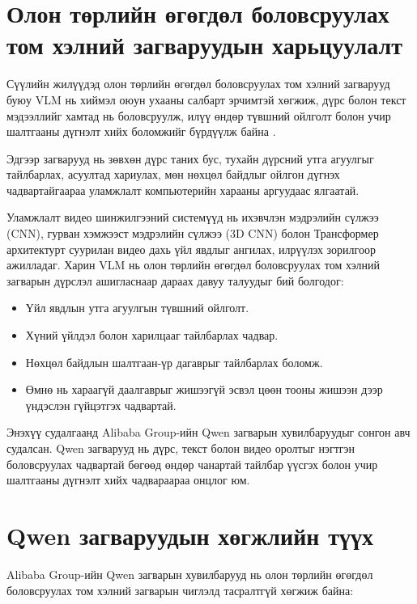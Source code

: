 \section{Олон төрлийн өгөгдөл боловсруулах том хэлний загваруудын харьцуулалт}

Сүүлийн жилүүдэд олон төрлийн өгөгдөл боловсруулах том хэлний загварууд буюу VLM нь хиймэл оюун ухааны салбарт эрчимтэй хөгжиж, дүрс болон текст мэдээллийг хамтад нь боловсруулж, илүү өндөр түвшний ойлголт болон учир шалтгааны дүгнэлт хийх боломжийг бүрдүүлж байна \cite{liu2023llava}.

Эдгээр загварууд нь зөвхөн дүрс таних бус, тухайн дүрсний утга агуулгыг тайлбарлах, асуултад хариулах, мөн нөхцөл байдлыг ойлгон дүгнэх чадвартайгаараа уламжлалт компьютерийн харааны аргуудаас ялгаатай.

Уламжлалт видео шинжилгээний системүүд нь ихэвчлэн мэдрэлийн сүлжээ (CNN), гурван хэмжээст  мэдрэлийн сүлжээ (3D CNN) болон Трансформер архитектурт суурилан видео дахь үйл явдлыг ангилах, илрүүлэх зорилгоор ажилладаг. Харин VLM нь олон төрлийн өгөгдөл боловсруулах том хэлний загварын дүрслэл ашигласнаар дараах давуу талуудыг бий болгодог:

\begin{itemize}
    \item Үйл явдлын утга агуулгын түвшний ойлголт.
    \item Хүний үйлдэл болон харилцааг тайлбарлах чадвар.
    \item Нөхцөл байдлын шалтгаан-үр дагаврыг тайлбарлах боломж.
    \item Өмнө нь хараагүй даалгаврыг жишээгүй эсвэл цөөн тооны жишээн дээр үндэслэн гүйцэтгэх чадвартай.
\end{itemize}

Энэхүү судалгаанд Alibaba Group-ийн Qwen загварын хувилбаруудыг \cite{qwen2vl2024,qwen25vl2025} сонгон авч судалсан. Qwen загварууд нь дүрс, текст болон видео оролтыг нэгтгэн боловсруулах чадвартай бөгөөд өндөр чанартай тайлбар үүсгэх болон учир шалтгааны дүгнэлт хийх чадвараараа онцлог юм.

\section{Qwen загваруудын хөгжлийн түүх}

Alibaba Group-ийн Qwen загварын хувилбарууд нь олон төрлийн өгөгдөл боловсруулах том хэлний загварын чиглэлд тасралтгүй хөгжиж байна:

